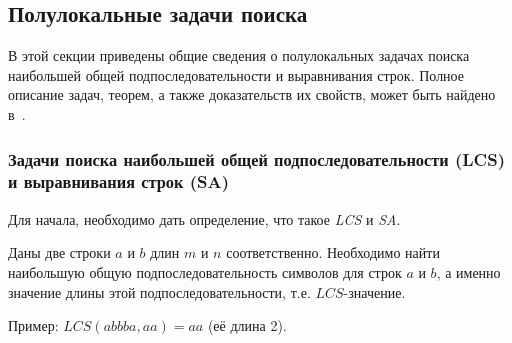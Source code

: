 

\subsection{Полулокальные задачи поиска}

В этой секции приведены общие сведения о полулокальных задачах поиска наибольшей общей подпоследовательности и выравнивания строк.
Полное описание задач, теорем, а также доказательств их свойств, может быть найдено в~\cite{alex2007semilocal}.

\subsubsection{Задачи поиска наибольшей общей подпоследовательности (LCS) и выравнивания строк (SA)}\mbox{}

Для начала, необходимо дать определение, что такое \emph{LCS} и \emph{SA}.

\begin{definition}
Даны две строки $a$ и $b$ длин $m$ и $n$ соответственно.
Необходимо найти наибольшую общую подпоследовательность символов для строк $a$ и $b$, а именно значение длины этой подпоследовательности, т.е. $LCS$-значение.
\end{definition}

Пример: \hspace{1cm}
    $LCS(abbba,aa)=aa$ (её длина 2).
 
